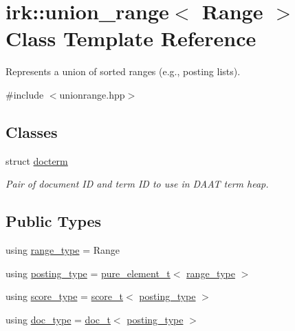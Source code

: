 \hypertarget{classirk_1_1union__range}{}\section{irk\+:\+:union\+\_\+range$<$ Range $>$ Class Template Reference}
\label{classirk_1_1union__range}


Represents a union of sorted ranges (e.\+g., posting lists).  




{\ttfamily \#include $<$unionrange.\+hpp$>$}

\subsection*{Classes}
\begin{DoxyCompactItemize}
\item 
struct \mbox{\hyperlink{structirk_1_1union__range_1_1docterm}{docterm}}
\begin{DoxyCompactList}\small\item\em Pair of document ID and term ID to use in D\+A\+AT term heap. \end{DoxyCompactList}\end{DoxyCompactItemize}
\subsection*{Public Types}
\begin{DoxyCompactItemize}
\item 
using \mbox{\hyperlink{classirk_1_1union__range_aae1621f1e73b1b78990ad11eaa52452b}{range\+\_\+type}} = Range
\item 
using \mbox{\hyperlink{classirk_1_1union__range_ac125c83e17d473ee5480fef76cfe42f9}{posting\+\_\+type}} = \mbox{\hyperlink{namespaceirk_a1e48b43a3f40d553264380da5e7263c1}{pure\+\_\+element\+\_\+t}}$<$ \mbox{\hyperlink{classirk_1_1union__range_aae1621f1e73b1b78990ad11eaa52452b}{range\+\_\+type}} $>$
\item 
using \mbox{\hyperlink{classirk_1_1union__range_af728218b976df464ebb051a9e5358e93}{score\+\_\+type}} = \mbox{\hyperlink{namespaceirk_a87bce44d1e3fdff0b1b3bb78f2a5f924}{score\+\_\+t}}$<$ \mbox{\hyperlink{classirk_1_1union__range_ac125c83e17d473ee5480fef76cfe42f9}{posting\+\_\+type}} $>$
\item 
using \mbox{\hyperlink{classirk_1_1union__range_aa502a10f2f5c682199072c0ba11a77a9}{doc\+\_\+type}} = \mbox{\hyperlink{namespaceirk_af5d95ec091f3bd711790e71ccb533903}{doc\+\_\+t}}$<$ \mbox{\hyperlink{classirk_1_1union__range_ac125c83e17d473ee5480fef76cfe42f9}{posting\+\_\+type}} $>$
\end{DoxyCompactItemize}
